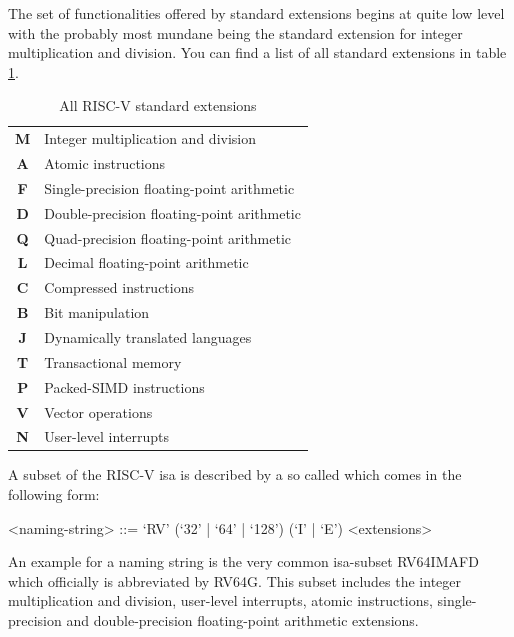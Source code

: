 The set of functionalities offered by standard extensions begins at quite low level with the probably most mundane being the standard extension for integer multiplication and division.
You can find a list of all standard extensions in table \ref{tbl:rv-exts}.

\begin{table}
    \centering
    \begin{tabular}{| c | l |}
        \hline
        \textbf{M} & Integer multiplication and division \\
        \textbf{A} & Atomic instructions \\
        \textbf{F} & Single-precision floating-point arithmetic \\
        \textbf{D} & Double-precision floating-point arithmetic \\
        \textbf{Q} & Quad-precision floating-point arithmetic \\
        \textbf{L} & Decimal floating-point arithmetic \\
        \textbf{C} & Compressed instructions \\
        \textbf{B} & Bit manipulation \\
        \textbf{J} & Dynamically translated languages \\
        \textbf{T} & Transactional memory \\
        \textbf{P} & Packed-SIMD instructions \\
        \textbf{V} & Vector operations \\
        \textbf{N} & User-level interrupts \\
        \hline
    \end{tabular}
    \caption{All RISC-V standard extensions}
    \label{tbl:rv-exts}
\end{table}

A subset of the RISC-V \gls{isa} is described by a so called  which comes in the following form:

\begin{grammar}
    <naming-string> ::= `RV' (`32' | `64' | `128') (`I' | `E') <extensions>
\end{grammar}

An example for a naming string is the very common \gls{isa}-subset RV64IMAFD which officially is abbreviated by RV64G.
This subset includes the integer multiplication and division, user-level interrupts, atomic instructions, single-precision and double-precision floating-point arithmetic extensions.

